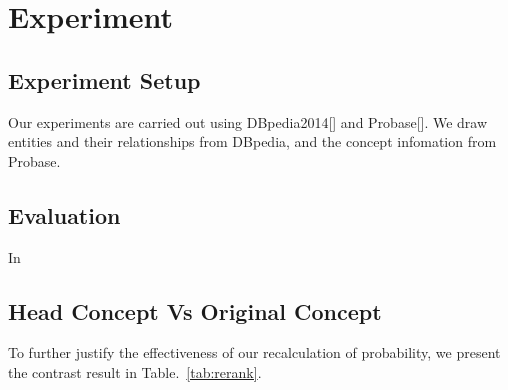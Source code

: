 \section{Experiment}
\label{sec:exp}  

\subsection{Experiment Setup}

Our experiments are carried out using DBpedia2014[] and Probase[]. We draw entities and their relationships from DBpedia, and the concept infomation from Probase.

\subsection{Evaluation}
In


\subsection{Head Concept Vs Original Concept}

To further justify the effectiveness of our recalculation of probability, we present the contrast result in Table.~\ref{tab:rerank}.



